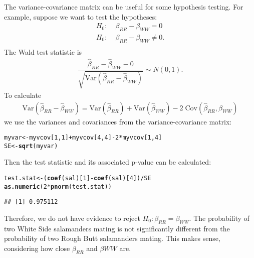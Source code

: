 \documentclass[11pt]{article}\usepackage[]{graphicx}\usepackage[]{color}
\makeatletter
\newcommand{\hlnum}[1]{\textcolor[rgb]{0.686,0.059,0.569}{#1}}%
\newcommand{\hlopt}[1]{\textcolor[rgb]{0,0,0}{#1}}%
\newcommand{\hlstd}[1]{\textcolor[rgb]{0.345,0.345,0.345}{#1}}%
\newcommand{\hlkwb}[1]{\textcolor[rgb]{0.69,0.353,0.396}{#1}}%
\newcommand{\hlkwd}[1]{\textcolor[rgb]{0.737,0.353,0.396}{\textbf{#1}}}%
\newenvironment{kframe}{%
 \def\at@end@of@kframe{}%
 \ifinner\ifhmode%
  \def\at@end@of@kframe{\end{minipage}}%
  \begin{minipage}{\columnwidth}%
 \fi\fi%
 \def\FrameCommand##1{\hskip\@totalleftmargin \hskip-\fboxsep
 \colorbox{shadecolor}{##1}\hskip-\fboxsep
     \hskip-\linewidth \hskip-\@totalleftmargin \hskip\columnwidth}%
 \MakeFramed {\advance\hsize-\width
   \@totalleftmargin\z@ \linewidth\hsize
   \@setminipage}}%
 {\par\unskip\endMakeFramed%
 \at@end@of@kframe}
\newenvironment{knitrout}{}{} %
\makeatother
\begin{document}
The variance-covariance matrix can be useful for some hypothesis testing. For example, suppose we want to test the hypotheses:
\begin{align*}
H_0: \; &\beta_{RR}-\beta_{WW}=0\\
H_0: \; &\beta_{RR}-\beta_{WW} \neq 0.\\
\end{align*}
The Wald test statistic is
\begin{align*}
\dfrac{ \hat{\beta}_{RR} - \hat{\beta}_{WW} - 0}{\sqrt { \text{Var} \left(\hat{\beta}_{RR} - \hat{\beta}_{WW} \right )   }  } \sim N(0,1).
\end{align*}
To calculate
\begin{align*}
\text{Var} \left(\hat{\beta}_{RR} - \hat{\beta}_{WW} \right ) 
= \text{Var} \left( \hat{\beta}_{RR}  \right)
+\text{Var} \left( \hat{\beta}_{WW}  \right)
-2 \; \text{Cov} \left( \hat{\beta}_{RR} , \hat{\beta}_{WW}  \right)
\end{align*}
we use the variances and covariances from the variance-covariance matrix:
\begin{knitrout}
\color{fgcolor}\begin{kframe}
\begin{alltt}
\hlstd{myvar} \hlkwb{<-} \hlstd{myvcov[}\hlnum{1}\hlstd{,}\hlnum{1}\hlstd{]} \hlopt{+} \hlstd{myvcov[}\hlnum{4}\hlstd{,}\hlnum{4}\hlstd{]} \hlopt{-} \hlnum{2}\hlopt{*} \hlstd{myvcov[}\hlnum{1}\hlstd{,}\hlnum{4}\hlstd{]}
\hlstd{SE} \hlkwb{<-} \hlkwd{sqrt}\hlstd{(myvar)}
\end{alltt}
\end{kframe}
\end{knitrout}
Then the test statistic and its associated p-value can be calculated:
\begin{knitrout}
\color{fgcolor}\begin{kframe}
\begin{alltt}
\hlstd{test.stat} \hlkwb{<-} \hlstd{(}\hlkwd{coef}\hlstd{(sal)[}\hlnum{1}\hlstd{]} \hlopt{-} \hlkwd{coef}\hlstd{(sal)[}\hlnum{4}\hlstd{])} \hlopt{/} \hlstd{SE}
\hlkwd{as.numeric}\hlstd{(}\hlnum{2} \hlopt{*} \hlkwd{pnorm}\hlstd{(test.stat))}
\end{alltt}
\begin{verbatim}
## [1] 0.975112
\end{verbatim}
\end{kframe}
\end{knitrout}
Therefore, we do not have evidence to reject $H_0: \beta_{RR}=\beta_{WW}$. The probability of two White Side salamanders mating is not significantly different from the probability of two Rough Butt salamanders mating. This makes sense, considering how close $\beta_{RR}$ and $\beta{WW}$ are.\\
\end{document}
